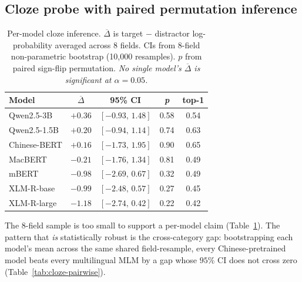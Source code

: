\documentclass[11pt,a4paper,twocolumn]{article}
\begin{document}
\subsection{Cloze probe with paired permutation inference}

\begin{table}[t!]
\centering
\caption{Per-model cloze inference. $\overline{\Delta}$ is target
$-$ distractor log-probability averaged across 8 fields. CIs from
8-field non-parametric bootstrap (10{,}000 resamples). $p$ from paired
sign-flip permutation. \emph{No single model's $\overline{\Delta}$ is
significant at $\alpha = 0.05$.}}
\label{tab:cloze-permodel}
\footnotesize
\setlength{\tabcolsep}{4pt}
\begin{tabular}{lcccc}
\toprule
\textbf{Model} & $\overline{\Delta}$ & \textbf{95\% CI} & \textit{p} & \textbf{top-1}\\
\midrule
Qwen2.5-3B          & $+0.36$  & $[-0.93,\,1.48]$ & 0.58 & 0.54 \\
Qwen2.5-1.5B        & $+0.20$  & $[-0.94,\,1.14]$ & 0.74 & 0.63 \\
Chinese-BERT        & $+0.16$  & $[-1.73,\,1.95]$ & 0.90 & 0.65 \\
MacBERT             & $-0.21$  & $[-1.76,\,1.34]$ & 0.81 & 0.49 \\
mBERT               & $-0.98$  & $[-2.69,\,0.67]$ & 0.32 & 0.49 \\
XLM-R-base          & $-0.99$  & $[-2.48,\,0.57]$ & 0.27 & 0.45 \\
XLM-R-large         & $-1.18$  & $[-2.74,\,0.42]$ & 0.22 & 0.42 \\
\bottomrule
\end{tabular}
\end{table}

The 8-field sample is too small to support a per-model claim
(Table~\ref{tab:cloze-permodel}). The pattern that \emph{is}
statistically robust is the cross-category gap: bootstrapping each
model's mean across the same shared field-resample, every
Chinese-pretrained model beats every multilingual MLM by a gap whose
$95\%$ CI does not cross zero (Table~\ref{tab:cloze-pairwise}).
\end{document}
